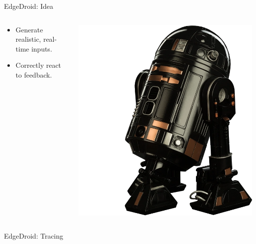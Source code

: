 \documentclass[aspectratio=1610]{beamer}
\begin{document}
\begin{frame}{EdgeDroid: Idea}
    \begin{columns}[onlytextwidth]
        \begin{column}{.5\linewidth}
            \begin{itemize}
                \itemsep2em
                \item Generate realistic, real-time inputs.
                \item Correctly react to feedback.
            \end{itemize}
        \end{column}%
        \begin{column}{.5\linewidth}
            \centering%
            \includegraphics[width=.7\linewidth]{img/astromech.png}
        \end{column}
    \end{columns}
\end{frame}

\begin{frame}{EdgeDroid: Tracing}
    \begin{center}
        \\
    \end{center}
\end{frame}
\end{document}
